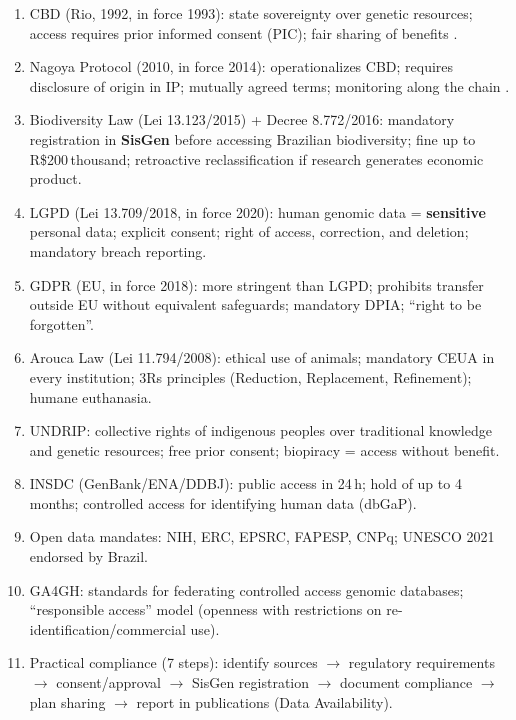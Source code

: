 \clearpage
\begin{revise}\small
\begin{enumerate}[itemsep=0pt, topsep=0pt, parsep=0pt]
    \item CBD (Rio, 1992, in force 1993): state sovereignty over genetic resources; access requires prior informed consent (PIC); fair sharing of benefits \parencite{cbd1992}.
    \item Nagoya Protocol (2010, in force 2014): operationalizes CBD; requires disclosure of origin in IP; mutually agreed terms; monitoring along the chain \parencite{nagoyaprotocol2014}.
    \item Biodiversity Law (Lei 13.123/2015) + Decree 8.772/2016: mandatory registration in \textbf{SisGen} before accessing Brazilian biodiversity; fine up to R\$200\,thousand; retroactive reclassification if research generates economic product.
    \item LGPD (Lei 13.709/2018, in force 2020): human genomic data = \textbf{sensitive} personal data; explicit consent; right of access, correction, and deletion; mandatory breach reporting.
    \item GDPR (EU, in force 2018): more stringent than LGPD; prohibits transfer outside EU without equivalent safeguards; mandatory DPIA; ``right to be forgotten''.
    \item Arouca Law (Lei 11.794/2008): ethical use of animals; mandatory CEUA in every institution; 3Rs principles (Reduction, Replacement, Refinement); humane euthanasia.
    \item UNDRIP: collective rights of indigenous peoples over traditional knowledge and genetic resources; free prior consent; biopiracy = access without benefit.
    \item INSDC (GenBank/ENA/DDBJ): public access in 24\,h; hold of up to 4 months; controlled access for identifying human data (dbGaP).
    \item Open data mandates: NIH, ERC, EPSRC, FAPESP, CNPq; UNESCO 2021 endorsed by Brazil.
    \item GA4GH: standards for federating controlled access genomic databases; ``responsible access'' model (openness with restrictions on re-identification/commercial use).
    \item Practical compliance (7 steps): identify sources $\to$ regulatory requirements $\to$ consent/approval $\to$ SisGen registration $\to$ document compliance $\to$ plan sharing $\to$ report in publications (Data Availability).
\end{enumerate}
\end{revise}

\clearpage

\printbibliography[heading=subbibliography,title={References}]

